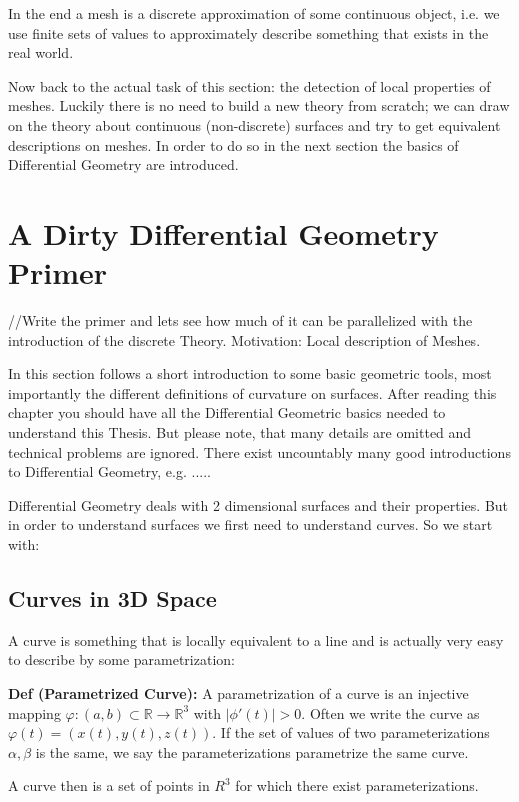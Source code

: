 	In the end a mesh is a discrete approximation of some continuous object, i.e. we use finite sets of values to approximately describe  something that exists in the real world.
	
	Now back to the actual task of this section: the detection of local properties of meshes. Luckily there is no need to build a new theory from scratch; we can draw on the theory about continuous (non-discrete) surfaces and try to get equivalent descriptions on meshes. In order to do so in the next section the basics of Differential Geometry are introduced.
	
	
	\section{A Dirty Differential Geometry Primer}
	
	//Write the primer and lets see how much of it can be parallelized with the introduction of the discrete Theory.
	Motivation: Local description of Meshes. 
	
	In this section follows a short introduction to some basic geometric tools, most importantly the different definitions of curvature on surfaces. After reading this chapter you should have all the Differential Geometric basics needed to understand this Thesis. But please note, that many details are omitted and technical problems are ignored. There exist uncountably many good introductions to Differential Geometry, e.g. .....
	
	Differential Geometry deals with 2 dimensional surfaces and their properties. But in order to understand surfaces we first need to understand curves. So we start with:
	
	\subsection{Curves in 3D Space}

	A curve is something that is locally equivalent to a line and is actually very easy to describe by some parametrization:
	
	\textbf{Def (Parametrized Curve):}  A parametrization of a curve is an injective mapping $ \varphi: (a,b) \subset \mathbb R \to \mathbb R^3$ with $|\phi'(t)|>0$. Often we write the curve as $\varphi(t) = (x(t), y(t), z(t))$. If the set of values of two parameterizations $\alpha, \beta$ is the same, we say the parameterizations parametrize the same curve.
	
A curve then is a set of points in $R^3$ for which there exist parameterizations. 

